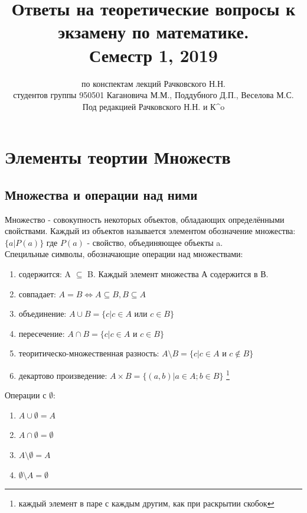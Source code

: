 \documentclass[oneside]{book}
\author{по конспектам лекций Рачковского Н.Н. \\ студентов группы 950501 Кагановича М.М., Поддубного Д.П., Веселова М.С. \\ Под редакцией Рачковского Н.Н. и К^o}
\begin{document}
\title{Ответы на теоретические вопросы к экзамену по математике. \\ Семестр 1, 2019}
\maketitle
\tableofcontents
\setcounter{chapter}{0}
\chapter[Множества]{Элементы теортии Множеств}
\section{Множества и операции над ними}

Множество - совокупность некоторых объектов, обладающих определёнными свойствами. Каждый из объектов
называется элементом обозначение множества: $\{a | P(a)\}$ где $P(a)$ - свойство, объединяющее объекты a.\\

Специльные символы, обозначающие операции над множествами:

\begin{enumerate}
    \item содержится: A $\subseteq$ B. Каждый элемент множества А содержится в В.
    \item совпадает: $A = B \Leftrightarrow A \subseteq B, B \subseteq A$
    \item объединение: $A \cup B = \{c | c \in A \textbf{ или } c \in B\}$
    \item пересечение: $A \cap B = \{c | c \in A \textbf{ и } c \in B\}$
    \item теоритическо-множественная разность: $A \setminus B = \{c|c \in A \textbf{ и } c \notin B\}$
    \item декартово произведение: $A \times B = \{(a, b) | a \in A; b \in B\}$ \footnote{каждый элемент в паре с
          каждым другим, как при раскрытии скобок}
\end{enumerate}

Операции с $\emptyset$:

\begin{enumerate}
    \item $A \cup \emptyset = A$
    \item $A \cap \emptyset = \emptyset$
    \item $A \setminus \emptyset = A$
    \item $\emptyset \setminus A = \emptyset$
\end{enumerate}
\end{document}
